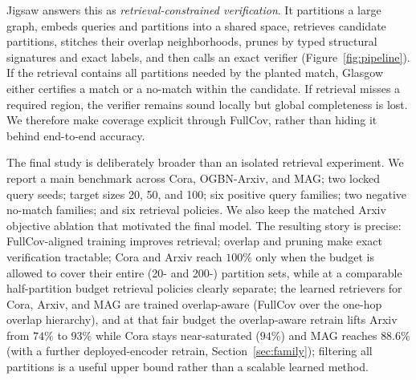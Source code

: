\documentclass[runningheads]{llncs}
\begin{document}
Jigsaw answers this as \emph{retrieval-constrained verification}. It partitions a large graph, embeds queries and partitions into a shared space, retrieves candidate partitions, stitches their overlap neighborhoods, prunes by typed structural signatures and exact labels, and then calls an exact verifier (Figure~\ref{fig:pipeline}). If the retrieval contains all partitions needed by the planted match, Glasgow either certifies a match or a no-match within the candidate. If retrieval misses a required region, the verifier remains sound locally but global completeness is lost. We therefore make coverage explicit through FullCov, rather than hiding it behind end-to-end accuracy.

The final study is deliberately broader than an isolated retrieval experiment. We report a main benchmark across Cora, OGBN-Arxiv, and MAG; two locked query seeds; target sizes 20, 50, and 100; six positive query families; two negative no-match families; and six retrieval policies. We also keep the matched Arxiv objective ablation that motivated the final model. The resulting story is precise: FullCov-aligned training improves retrieval; overlap and pruning make exact verification tractable; Cora and Arxiv reach $100\%$ only when the budget is allowed to cover their entire (20- and 200-) partition sets, while at a comparable half-partition budget retrieval policies clearly separate; the learned retrievers for Cora, Arxiv, and MAG are trained overlap-aware (FullCov over the one-hop overlap hierarchy), and at that fair budget the overlap-aware retrain lifts Arxiv from $74\%$ to $93\%$ while Cora stays near-saturated ($94\%$) and MAG reaches $88.6\%$ (with a further deployed-encoder retrain, Section~\ref{sec:family}); filtering all partitions is a useful upper bound rather than a scalable learned method.
\end{document}
